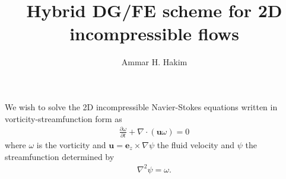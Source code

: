 \documentclass[11pt, reqno]{amsart}
\title[Incompressible Euler]{Hybrid DG/FE scheme for 2D incompressible
  flows}%
\author{Ammar H. Hakim}%
\date{}
\newcommand{\pfrac}[2]{\frac{\partial #1}{\partial #2}}
\newcommand{\mvec}[1]{\mathbf{#1}}
\theoremstyle{definition}
\begin{document}
\maketitle

We wish to solve the 2D incompressible Navier-Stokes equations written
in vorticity-streamfunction form as
\begin{align}
  \pfrac{\omega}{t} + \nabla\cdot(\mvec{u}\omega) = 0
\end{align}
where $\omega$ is the vorticity and $\mvec{u} = \mvec{e}_z \times \nabla
\psi$ the fluid velocity and $\psi$ the streamfunction determined by
\begin{align}
  \nabla^2\psi = \omega.
\end{align}
\end{document}
